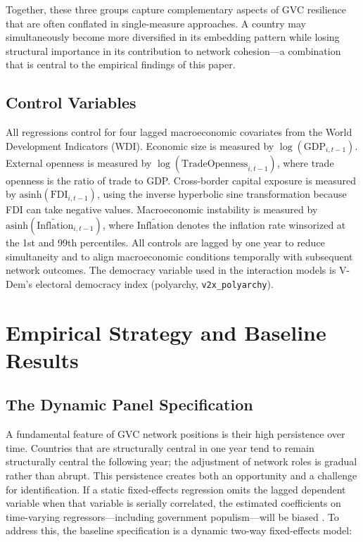 \documentclass[12pt]{article}
\begin{document}
Together, these three groups capture complementary aspects of GVC resilience that are often conflated in single-measure approaches. A country may simultaneously become more diversified in its embedding pattern while losing structural importance in its contribution to network cohesion---a combination that is central to the empirical findings of this paper.

\subsection{Control Variables}

All regressions control for four lagged macroeconomic covariates from the World Development Indicators (WDI). Economic size is measured by $\log(\text{GDP}_{i,t-1})$. External openness is measured by $\log(\text{TradeOpenness}_{i,t-1})$, where trade openness is the ratio of trade to GDP. Cross-border capital exposure is measured by $\text{asinh}(\text{FDI}_{i,t-1})$, using the inverse hyperbolic sine transformation because FDI can take negative values. Macroeconomic instability is measured by $\text{asinh}(\widetilde{\text{Inflation}}_{i,t-1})$, where $\widetilde{\text{Inflation}}$ denotes the inflation rate winsorized at the 1st and 99th percentiles. All controls are lagged by one year to reduce simultaneity and to align macroeconomic conditions temporally with subsequent network outcomes. The democracy variable used in the interaction models is V-Dem's electoral democracy index (polyarchy, \texttt{v2x\_polyarchy}).

\section{Empirical Strategy and Baseline Results}

\subsection{The Dynamic Panel Specification}

A fundamental feature of GVC network positions is their high persistence over time. Countries that are structurally central in one year tend to remain structurally central the following year; the adjustment of network roles is gradual rather than abrupt. This persistence creates both an opportunity and a challenge for identification. If a static fixed-effects regression omits the lagged dependent variable when that variable is serially correlated, the estimated coefficients on time-varying regressors---including government populism---will be biased \citep{nickell1981}. To address this, the baseline specification is a dynamic two-way fixed-effects model:
\end{document}
